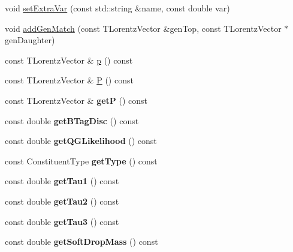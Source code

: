 \begin{DoxyCompactItemize}
\item 
void \hyperlink{classConstituent_a1b2fc086bc359e141e54ed2903c951c9}{set\-Extra\-Var} (const std\-::string \&name, const double var)
\item 
void \hyperlink{classConstituent_a2aea6bdc5229bb87227bcc8caa9c51c6}{add\-Gen\-Match} (const T\-Lorentz\-Vector \&gen\-Top, const T\-Lorentz\-Vector $\ast$gen\-Daughter)
\item 
const T\-Lorentz\-Vector \& \hyperlink{classConstituent_a3f918f1210cc666288327544e32d728c}{p} () const 
\item 
const T\-Lorentz\-Vector \& \hyperlink{classConstituent_a9f95db0ef9ae97fa0dc2cf45153e4131}{P} () const 
\item 
\hypertarget{classConstituent_ac4954793667cf0b2ffd136fbd8df0cda}{const T\-Lorentz\-Vector \& {\bfseries get\-P} () const }\label{classConstituent_ac4954793667cf0b2ffd136fbd8df0cda}

\item 
\hypertarget{classConstituent_a2f2ecea52ea42c57345b82908d94c472}{const double {\bfseries get\-B\-Tag\-Disc} () const }\label{classConstituent_a2f2ecea52ea42c57345b82908d94c472}

\item 
\hypertarget{classConstituent_a21587ed2fa9eb0d951fa025a71a467ea}{const double {\bfseries get\-Q\-G\-Likelihood} () const }\label{classConstituent_a21587ed2fa9eb0d951fa025a71a467ea}

\item 
\hypertarget{classConstituent_a59ef843f29a71d4bdbcb1c8f2a4e277d}{const Constituent\-Type {\bfseries get\-Type} () const }\label{classConstituent_a59ef843f29a71d4bdbcb1c8f2a4e277d}

\item 
\hypertarget{classConstituent_a24bb57d3a2bc3575c702d474f39e0fec}{const double {\bfseries get\-Tau1} () const }\label{classConstituent_a24bb57d3a2bc3575c702d474f39e0fec}

\item 
\hypertarget{classConstituent_aebb2fcd6b58c301924857923b2ac2b42}{const double {\bfseries get\-Tau2} () const }\label{classConstituent_aebb2fcd6b58c301924857923b2ac2b42}

\item 
\hypertarget{classConstituent_a14d765b378cfc2890eddba194caef04b}{const double {\bfseries get\-Tau3} () const }\label{classConstituent_a14d765b378cfc2890eddba194caef04b}

\item 
\hypertarget{classConstituent_a46be2f3c6bbac7d19893947adfc76b57}{const double {\bfseries get\-Soft\-Drop\-Mass} () const }\label{classConstituent_a46be2f3c6bbac7d19893947adfc76b57}


\end{DoxyCompactItemize}
